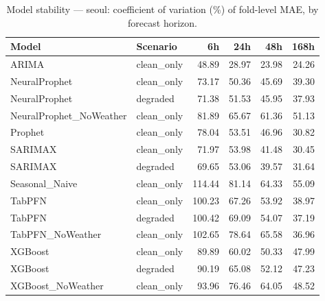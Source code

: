 \begin{table}[h]
\centering
\caption{Model stability — seoul: coefficient of variation (\%) of fold-level MAE, by forecast horizon.}
\label{tab:stability_seoul}
\begin{tabular}{llrrrr}
\toprule
Model & Scenario & 6h & 24h & 48h & 168h \\
\midrule
ARIMA & clean\_only & 48.89 & 28.97 & 23.98 & 24.26 \\
NeuralProphet & clean\_only & 73.17 & 50.36 & 45.69 & 39.30 \\
NeuralProphet & degraded & 71.38 & 51.53 & 45.95 & 37.93 \\
NeuralProphet\_NoWeather & clean\_only & 81.89 & 65.67 & 61.36 & 51.13 \\
Prophet & clean\_only & 78.04 & 53.51 & 46.96 & 30.82 \\
SARIMAX & clean\_only & 71.97 & 53.98 & 41.48 & 30.45 \\
SARIMAX & degraded & 69.65 & 53.06 & 39.57 & 31.64 \\
Seasonal\_Naive & clean\_only & 114.44 & 81.14 & 64.33 & 55.09 \\
TabPFN & clean\_only & 100.23 & 67.26 & 53.92 & 38.97 \\
TabPFN & degraded & 100.42 & 69.09 & 54.07 & 37.19 \\
TabPFN\_NoWeather & clean\_only & 102.65 & 78.64 & 65.58 & 36.96 \\
XGBoost & clean\_only & 89.89 & 60.02 & 50.33 & 47.99 \\
XGBoost & degraded & 90.19 & 65.08 & 52.12 & 47.23 \\
XGBoost\_NoWeather & clean\_only & 93.96 & 76.46 & 64.05 & 48.52 \\
\bottomrule
\end{tabular}
\end{table}
